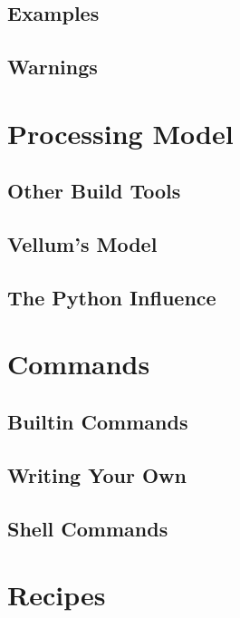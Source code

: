 \subsection{Examples}


\subsection{Warnings}



\section{Processing Model}


\subsection{Other Build Tools}


\subsection{Vellum's Model}


\subsection{The Python Influence}



\section{Commands}


\subsection{Builtin Commands}


\subsection{Writing Your Own}


\subsection{Shell Commands}



\section{Recipes}


